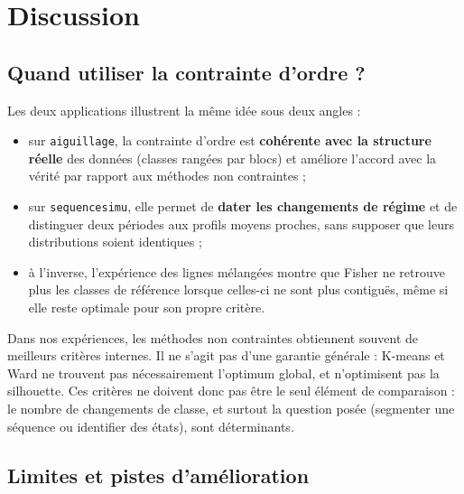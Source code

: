 \documentclass[10pt,a4paper]{article}
\begin{document}
\clearpage
\section{Discussion}

\subsection{Quand utiliser la contrainte d'ordre ?}

Les deux applications illustrent la même idée sous deux angles :
\begin{itemize}
  \item sur \texttt{aiguillage}, la contrainte d'ordre est \textbf{cohérente avec la
        structure réelle} des données (classes rangées par blocs) et améliore
        l'accord avec la vérité par rapport aux méthodes non contraintes ;
  \item sur \texttt{sequencesimu}, elle permet de \textbf{dater les changements de
        régime} et de distinguer deux périodes aux profils moyens proches, sans supposer
        que leurs distributions soient identiques ;
  \item à l'inverse, l'expérience des lignes mélangées montre que Fisher
        ne retrouve plus les classes de référence lorsque celles-ci ne sont plus
        contiguës, même si elle reste optimale pour son propre critère.
\end{itemize}
Dans nos expériences, les méthodes non contraintes obtiennent souvent de
meilleurs critères internes. Il ne s'agit pas d'une garantie générale : K-means
et Ward ne trouvent pas nécessairement l'optimum global, et n'optimisent pas
la silhouette. Ces critères ne doivent donc pas être le seul élément de comparaison : le nombre de
changements de classe, et surtout la question posée (segmenter une séquence ou
identifier des états), sont déterminants.

\subsection{Limites et pistes d'amélioration}
\end{document}
